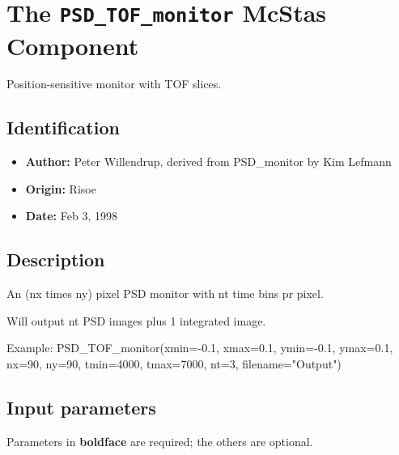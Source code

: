\section{The \texttt{PSD\_TOF\_monitor} McStas Component}
Position-sensitive monitor with TOF slices.

\subsection*{Identification}
\begin{itemize}
  \item \textbf{Author:} Peter Willendrup, derived from PSD\_monitor by Kim Lefmann
  \item \textbf{Origin:} Risoe
  \item \textbf{Date:} Feb 3, 1998
\end{itemize}

\subsection*{Description}
An (nx times ny) pixel PSD monitor with nt time bins pr pixel.

Will output nt PSD images plus 1 integrated image.

Example: PSD\_TOF\_monitor(xmin=-0.1, xmax=0.1, ymin=-0.1, ymax=0.1, nx=90, ny=90, tmin=4000, tmax=7000, nt=3, filename="Output")

\subsection*{Input parameters}
Parameters in \textbf{boldface} are required; the others are optional.

